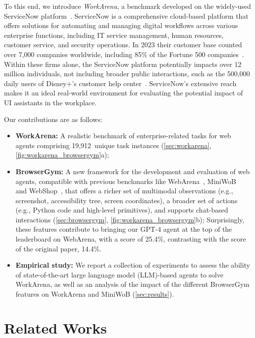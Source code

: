 \documentclass{article}
\theoremstyle{plain}
\theoremstyle{definition}
\theoremstyle{remark}
\newcommand{\wainstancecount}{{19,912}}
\begin{document}
To this end, we introduce \emph{WorkArena}, a benchmark developed on the widely-used ServiceNow platform~\citep{servicenow/vancouver}. ServiceNow is a comprehensive cloud-based platform that offers solutions for automating and managing digital workflows across various enterprise functions, including IT service management, human resources, customer service, and security operations.
In 2023 their customer base counted over 7,000 companies worldwide, including 85\% of the Fortune 500 companies~\citep{fortune500_2023}. 
Within these firms alone, the ServiceNow platform potentially impacts over 12 million individuals, not including broader public interactions,
such as the 500,000 daily users of Disney+'s customer help center~\citep{maas2020knowledge}.
ServiceNow's extensive reach makes it an ideal real-world environment for evaluating the potential impact of UI assistants in the workplace.%


Our contributions are as follows:
\begin{itemize}
    \item \textbf{WorkArena:} A realistic benchmark of enterprise-related tasks for web agents comprising \wainstancecount\ unique task instances (\cref{sec:workarena}, \cref{fig:workarena_browsergym}a);
    \item \textbf{BrowserGym:} A new framework for the development and evaluation of web agents, compatible with previous benchmarks like WebArena~\citep{zhou2023webarena}, MiniWoB~\citep{LiuL18MiniWoB, Shi2017MiniWoB} and WebShop~\citep{yao2022webshop}, that offers a richer set of multimodal observations (e.g., screenshot, accessibility tree, screen coordinates), a broader set of actions (e.g., Python code and high-level primitives), and supports chat-based interactions (\cref{sec:browsergym}, \cref{fig:workarena_browsergym}b); Surprisingly, these features contribute to bringing our GPT-4 agent at the top of the leaderboard on WebArena, with a score of 25.4\%, contrasting with the score of the original paper, 14.4\%.
    \item \textbf{Empirical study:} We report a collection of experiments to assess the ability of state-of-the-art large language model (LLM)-based agents to solve WorkArena, as well as an analysis of the impact of the different BrowserGym features on WorkArena and MiniWoB (\cref{sec:results}).
\end{itemize}


\section{Related Works}
\end{document}
